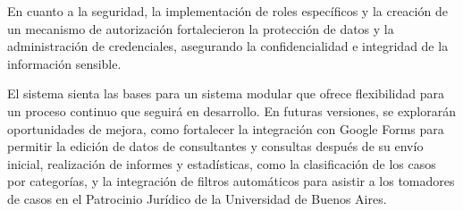En cuanto a la seguridad, la implementación de roles específicos y la creación de un mecanismo de autorización fortalecieron la protección de datos y la administración de credenciales, asegurando la confidencialidad e integridad de la información sensible.

El sistema sienta las bases para un sistema modular que ofrece flexibilidad para un proceso continuo que seguirá en desarrollo. En futuras versiones, se explorarán oportunidades de mejora, como fortalecer la integración con Google Forms para permitir la edición de datos de consultantes y consultas después de su envío inicial, realización de informes y estadísticas, como la clasificación de los casos por categorías, y la integración de filtros automáticos para asistir a los tomadores de casos en el Patrocinio Jurídico de la Universidad de Buenos Aires.